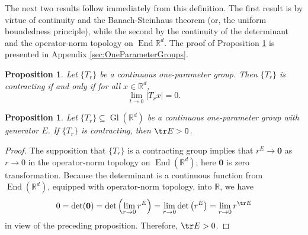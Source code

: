 \documentclass[11pt, letter]{book}
\newtheorem{proposition}[theorem]{Proposition}
\newcommand\End{\operatorname{End}} %
\newcommand\Gl{\operatorname{Gl}} %
\renewcommand\det{\operatorname{det}}
\begin{document}
\noindent The next two results follow immediately from this definition. The first result is by virtue of continuity and the Banach-Steinhaus theorem (or, the uniform boundedness principle), while the second by the continuity of the determinant and the operator-norm topology on $\End{\mathbb{R}^d}$. The proof of Proposition \ref{prop:ContractingCharacterization} is presented in Appendix \ref{sec:OneParameterGroups}.
\begin{framed}
\begin{proposition}\label{prop:ContractingCharacterization}
Let $\{T_r\}$ be a continuous one-parameter group. Then $\{T_r\}$ is contracting if and only if for all $x\in\mathbb{R}^d$,
\begin{equation}
\lim_{t\to 0}|T_r x|=0.
\end{equation}
\end{proposition}
\end{framed}

\begin{framed}
\begin{proposition}\label{prop:ContractingTrace}
Let $\{T_r\}\subseteq \Gl(\mathbb{R}^d)$ be a continuous one-parameter group with generator $E$. If $\{T_r\}$ is  contracting, then $\tr E>0$.
\end{proposition}
\end{framed}
\begin{proof}
The supposition that $\{T_r\}$ is a contracting group implies that $r^E\to \mathbf{0}$ as $r\to 0$ in the operator-norm topology on $\End(\mathbb{R}^d)$; here $\mathbf{0}$ is zero transformation. Because the determinant is a continuous function from $\End(\mathbb{R}^d)$, equipped with operator-norm topology, into $\mathbb{R}$, we have
\begin{equation*}
0=\det(\mathbf{0})=\det\left(\lim_{r\to 0}r^E\right)=\lim_{r\to 0}\det\left(r^E\right)=\lim_{r\to 0}r^{\tr E}
\end{equation*}
in view of the preceding proposition. Therefore, $\tr E>0$.
\end{proof}


\end{document}
